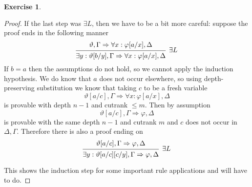 \documentclass{article}
\newcommand{\sequent}[2]{#1\Rightarrow#2}
\theoremstyle{definition}
\newtheorem{question}{Exercise}
\begin{document}
\begin{question}
\begin{proof}
        If the last step was \(\exists L\), then we have to be a bit more
        careful: suppose the proof ends in the following manner
        \[
            \begin{prooftree}
                \hypo{\sequent{\vartheta,\Gamma}{\forall x:\varphi[a/x],\Delta}}
                \infer1[\(\exists L\)]{\sequent{\exists y:\vartheta[b/y],\Gamma}{\forall x:\varphi[a/x],\Delta}}
            \end{prooftree}
        \]
        If \(b=a\) then the assumptions do not hold, so we cannot apply the
        induction hypothesis. We do know that \(a\) does not occur elsewhere, so
        using depth-preserving substitution we know that taking \(c\) to be a
        fresh variable
        \[
            \sequent{\vartheta[a/c],\Gamma}{\forall x:\varphi[a/x],\Delta}
        \]
        is provable with depth \(n-1\) and cutrank \(\leq m\). Then by
        assumption
        \[
            \sequent{\vartheta[a/c],\Gamma}{\varphi,\Delta}
        \]
        is provable with the same depth \(n-1\) and cutrank \(m\) and \(c\) does
        not occur in \(\Delta,\Gamma\). Therefore there is also a proof ending
        on
        \[
            \begin{prooftree}
                \hypo{\sequent{\vartheta[a/c],\Gamma}{\varphi,\Delta}}
                \infer1[\(\exists L\)]{\sequent{\exists y:\vartheta[a/c][c/y],\Gamma}{\varphi,\Delta}                }
            \end{prooftree}
        \]

        This shows the induction step for some important rule applications and
        will have to do.
    \end{proof}
\end{question}
\end{document}
